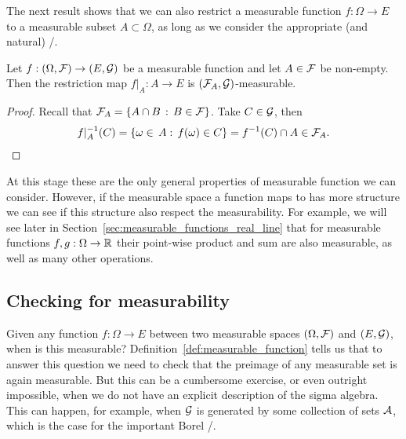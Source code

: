 The next result shows that we can also restrict a measurable function $f : \Omega \to E$ to a measurable subset $A \subset \Omega$, as long as we consider the appropriate (and natural) \sigalg/.

\begin{lemma}
Let $f: (\Omega, \mathcal F) \to (E, \mathcal G)$ be a measurable function and let $A \in \mathcal F$ be non-empty. Then the restriction map $f|_A : A \to E$ is $(\mathcal F_A, \mathcal G)$-measurable.
\end{lemma}

\begin{proof}
Recall that $\mathcal F_A = \{A \cap B \, : \, B \in \mathcal F\}$. Take $C \in \mathcal G$, then
\[
	f|_A^{-1}(C) = \{\omega \in \, A : \, f(\omega) \in C\} = f^{-1}(C) \cap A \in \mathcal F_A.\qedhere
\]
\end{proof}

At this stage these are the only general properties of measurable function we can consider. However, if the measurable space a function maps to has more structure we can see if this structure also respect the measurability. For example, we will see later in Section~\ref{sec:measurable_functions_real_line} that for measurable functions $f, g : \Omega \to \mathbb R$ their point-wise product and sum are also measurable, as well as many other operations.


\subsection{Checking for measurability}

Given any function $f : \Omega \to E$ between two measurable spaces $(\Omega, \mathcal F)$ and $(E, \mathcal G)$, when is this measurable? Definition~\ref{def:measurable_function} tells us that to answer this question we need to check that the preimage of any measurable set is again measurable. But this can be a cumbersome exercise, or even outright impossible, when we do not have an explicit description of the sigma algebra. This can happen, for example, when $\mathcal G$ is generated by some collection of sets $\mathcal A$, which is the case for the important Borel \sigalg/. 

